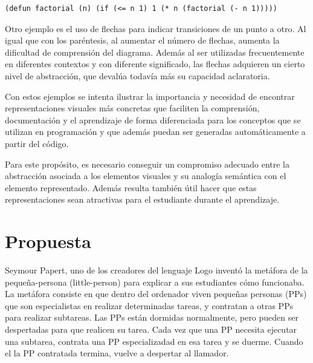 \documentclass{llncs}
\begin{document}
\begin{verbatim}
(defun factorial (n) (if (<= n 1) 1 (* n (factorial (- n 1)))))
\end{verbatim}

Otro ejemplo es el uso de flechas para indicar transiciones de un punto a otro. Al igual que con los paréntesis, al aumentar el número de flechas, aumenta la dificultad de comprensión del diagrama. Además al ser utilizadas frecuentemente en diferentes contextos y con diferente significado, las flechas adquieren un cierto nivel de abstracción, que devalúa todavía más su capacidad aclaratoria. 

Con estos ejemplos se intenta ilustrar la importancia y necesidad de encontrar representaciones visuales más concretas que faciliten la comprensión, documentación y el aprendizaje de forma diferenciada para los conceptos que se utilizan en programación y que además puedan ser generadas automáticamente a partir del código. 

Para este propósito, es necesario conseguir un compromiso adecuado entre la abstracción asociada a los elementos visuales y su analogía semántica con el elemento representado. Además resulta también útil hacer que estas representaciones sean atractivas para el estudiante durante el aprendizaje. 




\section{Propuesta}
\label{sec:proposal}

Seymour Papert, uno de los creadores del lenguaje Logo inventó la metáfora de la pequeña-persona (little-person) para explicar a sus estudiantes cómo funcionaba. La metáfora consiste en que dentro del ordenador viven pequeñas personas (PPs) que son especialistas en realizar determinadas tareas, y contratan a otras PPs para realizar subtareas. Las PPs están dormidas normalmente, pero pueden ser despertadas para que realicen su tarea. Cada vez que una PP necesita ejecutar una subtarea, contrata una PP especializadad en esa tarea y se duerme. Cuando el la PP contratada termina, vuelve a despertar al llamador. 
\end{document}

